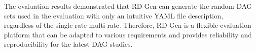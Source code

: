The evaluation results demonstrated that RD-Gen can generate the random DAG sets used in the evaluation with only an intuitive YAML file description, regardless of the single rate multi rate.
Therefore, RD-Gen is a flexible evaluation platform that can be adapted to various requirements and provides reliability and reproducibility for the latest DAG studies.
